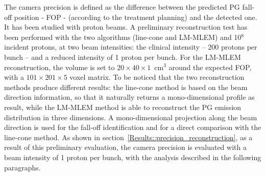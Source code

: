 The camera precision is defined as the difference between the predicted PG fall-off position - FOP - (according to the treatment planning) and the detected one. It has been studied with proton beams.
A preliminary reconstruction test has been performed with the two algorithms (line-cone and LM-MLEM) and 10$^8$ incident protons, at two beam intensities: the clinical intensity -- 200 protons per bunch -- and a reduced intensity of 1 proton per bunch. For the LM-MLEM reconstruction, the volume is set to $20\times40\times1$~cm$^3$ around the expected FOP, with a $101\times201\times5$ voxel matrix. To be noticed that the two reconstruction methods produce different results: the line-cone method is based on the beam direction information, so that it naturally returns a mono-dimensional profile as result, while the LM-MLEM method is able to reconstruct the PG emission distribution in three dimensions. A mono-dimensional projection along the beam direction is used for the fall-off identification and for a direct comparison with the line-cone method. As shown in section~\ref{Results::precision_reconstruction}, as a result of this preliminary evaluation, the camera precision is evaluated with a beam intensity of 1 proton per bunch, with the analysis described in the following paragraphs.

